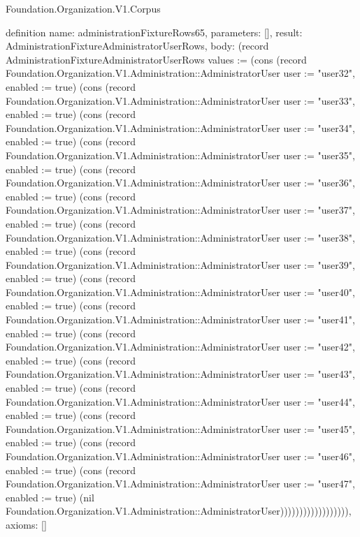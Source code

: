 \begin{lexlean}{Foundation.Organization.V1.Corpus}
\begin{semanticmodule}
definition{
  name: administrationFixtureRows65,
  parameters: [],
  result: AdministrationFixtureAdministratorUserRows,
  body: (record AdministrationFixtureAdministratorUserRows {values := (cons (record Foundation.Organization.V1.Administration::AdministratorUser {user := "user32", enabled := true}) (cons (record Foundation.Organization.V1.Administration::AdministratorUser {user := "user33", enabled := true}) (cons (record Foundation.Organization.V1.Administration::AdministratorUser {user := "user34", enabled := true}) (cons (record Foundation.Organization.V1.Administration::AdministratorUser {user := "user35", enabled := true}) (cons (record Foundation.Organization.V1.Administration::AdministratorUser {user := "user36", enabled := true}) (cons (record Foundation.Organization.V1.Administration::AdministratorUser {user := "user37", enabled := true}) (cons (record Foundation.Organization.V1.Administration::AdministratorUser {user := "user38", enabled := true}) (cons (record Foundation.Organization.V1.Administration::AdministratorUser {user := "user39", enabled := true}) (cons (record Foundation.Organization.V1.Administration::AdministratorUser {user := "user40", enabled := true}) (cons (record Foundation.Organization.V1.Administration::AdministratorUser {user := "user41", enabled := true}) (cons (record Foundation.Organization.V1.Administration::AdministratorUser {user := "user42", enabled := true}) (cons (record Foundation.Organization.V1.Administration::AdministratorUser {user := "user43", enabled := true}) (cons (record Foundation.Organization.V1.Administration::AdministratorUser {user := "user44", enabled := true}) (cons (record Foundation.Organization.V1.Administration::AdministratorUser {user := "user45", enabled := true}) (cons (record Foundation.Organization.V1.Administration::AdministratorUser {user := "user46", enabled := true}) (cons (record Foundation.Organization.V1.Administration::AdministratorUser {user := "user47", enabled := true}) (nil Foundation.Organization.V1.Administration::AdministratorUser)))))))))))))))))}),
  axioms: []
}


\end{semanticmodule}
\end{lexlean}
